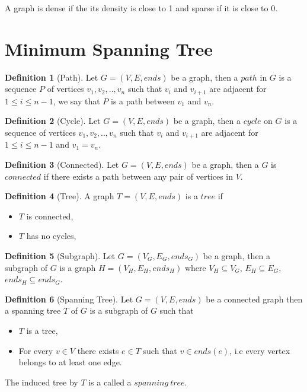 \documentclass{report}
\theoremstyle{plain}
\theoremstyle{definition}
\newtheorem{definition}{Definition}
\theoremstyle{remark}
\begin{document}
A graph is dense if the its density is close to 1 and sparse if it is close to 0.

\section*{Minimum Spanning Tree}

\begin{definition}[Path]
Let $G = (V, E, ends)$ be a graph, then a $path$ in $G$ is a sequence $P$ of vertices $v_1,v_2,..,v_n$ such that $v_i$ and $v_{i+1}$ are adjacent for $1 \leq i \leq n - 1$, we say that $P$ is a path between $v_1$ and $v_n$.
\end{definition}

\begin{definition}[Cycle]
Let $G = (V, E, ends)$ be a graph, then a $cycle$ on $G$ is a sequence of vertices $v_1,v_2,..,v_n$ such that $v_i$ and $v_{i+1}$ are adjacent for $1 \leq i \leq n - 1$ and $v_1=v_n$.
\end{definition}

\begin{definition}[Connected]
Let $G = (V, E, ends)$ be a graph, then a $G$ is $connected$ if there exists a path between any pair of vertices in $V$.
\end{definition}

\begin{definition}[Tree]
A graph $T = (V, E, ends)$ is a $tree$ if
\begin{itemize}
\item $T$ is connected,
\item $T$ has no cycles,
\end{itemize}
\end{definition}

\begin{definition}[Subgraph]
Let $G = (V_G, E_G, ends_G)$ be a graph, then a subgraph of $G$ is a graph $H = (V_H, E_H, ends_H)$ where $V_H \subseteq V_G$, $E_H \subseteq E_G$, $ends_H \subseteq ends_G$.
\end{definition}

\begin{definition}[Spanning Tree]
Let $G = (V, E, ends)$ be a connected graph then a spanning tree $T$ of $G$ is a subgraph of $G$ such that
\begin{itemize}
\item $T$ is a tree,
\item For every $v \in V$ there exists $e \in T$ such that $v \in ends(e)$, i.e every vertex belongs to at least one edge.
\end{itemize}
The induced tree by $T$ is a called a $spanning \  tree$.
\end{definition}
\end{document}
